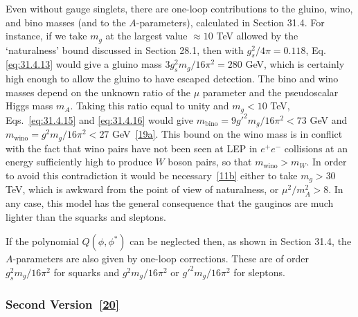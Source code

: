 Even without gauge singlets, there are one-loop contributions to the gluino,
wino, and bino masses (and to the \(A\)-parameters), calculated in Section
31.4. For instance, if we take \(m_g\) at the largest value
\(\approx10\) TeV allowed by the `naturalness' bound discussed in Section
28.1, then with \(g_s^2/4\pi=0.118\), Eq. \eqref{eq:31.4.13} would give a
gluino mass \(3g_s^2m_g/16\pi^2=280\) GeV, which is certainly high enough to
allow the gluino to have escaped detection. The bino and wino masses depend
on the unknown ratio of the \(\mu\) parameter and the pseudoscalar Higgs
mass \(m_A\). Taking this ratio equal to unity and \(m_g<10\) TeV,
Eqs.~\eqref{eq:31.4.15} and \eqref{eq:31.4.16} would give
\(m_{\mathrm{bino}}=9g'^2m_g/16\pi^2<73\) GeV and
\(m_{\mathrm{wino}}=g^2m_g/16\pi^2<27\)
GeV~\hyperref[ch31-ref-19a]{[19a]}. This bound on the wino mass is in
conflict with the fact that wino pairs have not been seen at LEP in
\(e^+e^-\) collisions at an energy sufficiently high to produce \(W\)
boson pairs, so that \(m_{\mathrm{wino}}>m_W\). In order to avoid this
contradiction it would be necessary~\hyperref[ch31-ref-11b]{[11b]} either
to take \(m_g>30\) TeV, which is awkward from the point of view of
naturalness, or \(\mu^2/m_A^2>8\). In any case, this model has the general
consequence that the gauginos are much lighter than the squarks and
sleptons.

If the polynomial \(Q(\phi,\phi^*)\) can be neglected then, as shown in
Section 31.4, the \(A\)-parameters are also given by one-loop corrections.
These are of order \(g_s^2m_g/16\pi^2\) for squarks and
\(g^2m_g/16\pi^2\) or \(g'^2m_g/16\pi^2\) for sleptons.

\subsubsection*{Second Version~\hyperref[ch31-ref-20]{[20]}}

